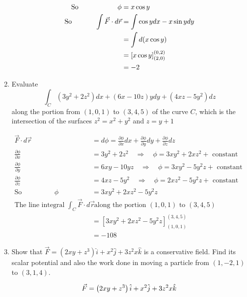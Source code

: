 \begin{enumerate}
\begin{answer}
\begin{align*}
		 \text{So}\hspace{2cm}  \phi &=x \cos y \\ \text{So}\hspace{1.2cm} \int \vec{F} \cdot d \vec{r} &=\int \cos y d x-x \sin y d y \\ &=\int d(x \cos y) \\ &=[x \cos y]_{(2,0)}^{(0,2)} \\ &=-2 
		\end{align*}
	\end{answer}
	\item Evaluate
	$$
	\int_{C}\left(3 y^{2}+2 z^{2}\right) d x+(6 x-10 z) y d y+\left(4 x z-5 y^{2}\right) d z
	$$
	along the portion from $(1,0,1)$ to $(3,4,5)$ of the curve $C$, which is the intersection of the surfaces $z^{2}=x^{2}+y^{2}$ and $z=y+1$
	\begin{answer}
		\begin{align*}
	 \vec{F} \cdot d \vec{r} &=d \phi=\frac{\partial \phi}{\partial x} d x+\frac{\partial \phi}{\partial y} d y+\frac{\partial \phi}{\partial z} d z \\ \frac{\partial \phi}{\partial x} &=3 y^{2}+2 z^{2} \quad \Rightarrow \quad \phi=3 x y^{2}+2 x z^{2}+\text { constant } \\ \frac{\partial \phi}{\partial y} &=6 x y-10 y z \quad \Rightarrow \quad \phi=3 x y^{2}-5 y^{2} z+\text { constant } \\ \frac{\partial \phi}{\partial z} &=4 x z-5 y^{2} \quad \Rightarrow \quad \phi=2 x z^{2}-5 y^{2} z+\text { constant } \\ \text{So}\hspace{2cm}\phi &=3 x y^{2}+2 x z^{2}-5 y^{2} z \\
	 \text{The line integral }\int_{C} \vec{F} \cdot d \vec{r}&\text{ along the portion }(1,0,1)\text{ to }(3,4,5)\\
	 &=\left[3 x y^{2}+2 x z^{2}-5 y^{2} z\right]_{(1,0,1)}^{(3,4,5)} \\
	 &=-108
		\end{align*}
	\end{answer}
	\item Show that $\vec{F}=\left(2 x y+z^{3}\right) \hat{i}+x^{2} \hat{j}+3 z^{2} x \hat{k}$ is a conservative field. Find its scalar potential and also the work done in moving a particle from $(1,-2,1)$ to $(3,1,4)$.
	\begin{answer}
		\begin{align}
		\vec{F}&=\left(2 x y+z^{3}\right) \hat{i}+x^{2} \hat{j}+3 z^{2} x \hat{k}\notag\\

\end{align}
\end{answer}
\end{enumerate}
